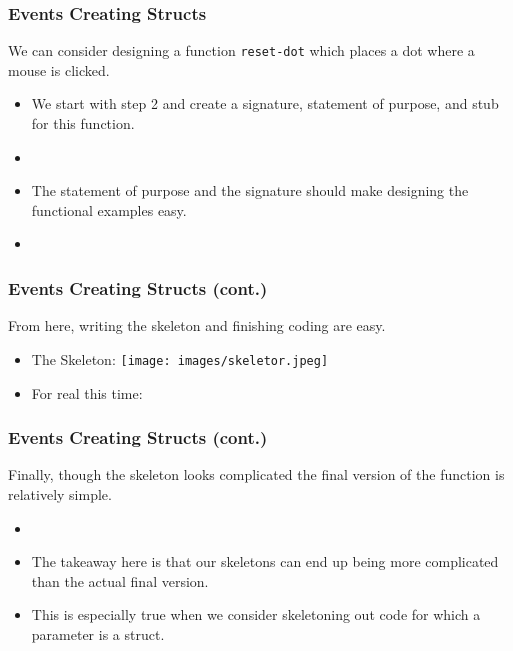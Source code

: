 \documentclass{beamer}
\begin{document}

\begin{frame}
  \frametitle{Events Creating Structs}
  We can consider designing a function \texttt{reset-dot}
  which places a dot where a mouse is clicked.
  \begin{itemize}
  \item<2-> We start with step 2 and create a signature, statement of
    purpose, and stub for this function.
  \item<3-> \ResetDotHeader
  \item<4-> The statement of purpose and the signature should make
    designing the functional examples easy.
  \item<5-> \ResetDotExamples
  \end{itemize}
\end{frame}

\begin{frame}
  \frametitle{Events Creating Structs (cont.)}
  From here, writing the skeleton and finishing coding are easy.
  \begin{itemize}
  \item<2-> The Skeleton:    
    \texttt{[image: images/skeletor.jpeg]}
  \item<3-> For real this time:    \ResetDotSkeleton
  \end{itemize}
\end{frame}

\begin{frame}
  \frametitle{Events Creating Structs (cont.)}
      Finally, though the skeleton looks complicated the final version
    of the function is relatively simple.
  \begin{itemize}
  \item<2-> \ResetDotFinal
  \item<3-> The takeaway here is that our skeletons can end up being
    more complicated than the actual final version.
  \item<4-> This is especially true when we consider skeletoning
    out code for which a parameter is a struct.
  \end{itemize}
\end{frame}

\end{document}
